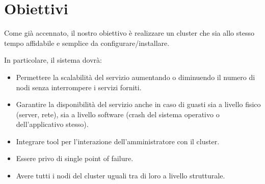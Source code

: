
\section{Obiettivi}
Come già accennato, il nostro obiettivo è realizzare un cluster che sia allo stesso tempo affidabile e semplice da configurare/installare.

In particolare, il sistema dovrà:
\begin{itemize}
    \item Permettere la scalabilità del servizio aumentando o diminuendo il numero di nodi senza interrompere i servizi forniti.
    \item Garantire la disponibilità del servizio anche in caso di guasti sia a livello fisico (server, rete), sia a livello software (crash del sistema operativo o dell'applicativo stesso).
    \item Integrare tool per l'interazione dell'amministratore con il cluster.
    \item Essere privo di single point of failure.
    \item Avere tutti i nodi del cluster uguali tra di loro a livello strutturale.
\end{itemize}
